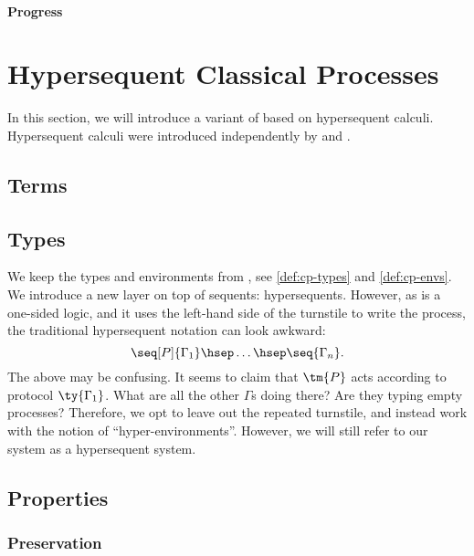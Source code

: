 \documentclass{article}
\begin{document}
\paragraph{Progress}\label{sec:cp-progress}



\section{Hypersequent Classical Processes}\label{sec:hcp}
In this section, we will introduce a variant of \cp based on hypersequent
calculi.
Hypersequent calculi were introduced independently by \textcite{avron1987} and
\textcite{pottinger1983}.

\subsection{Terms}\label{sec:hcp-terms}




\subsection{Types}\label{sec:hcp-types}
We keep the types and environments from \cp, see \cref{def:cp-types} and
\cref{def:cp-envs}.
We introduce a new layer on top of sequents: hypersequents.
However, as \cp is a one-sided logic, and it uses the left-hand side of the
turnstile to write the process, the traditional hypersequent notation can look
awkward:
\[
  \seq[P]{\Gamma_1}\hsep\dots\hsep\seq{\Gamma_n}.
\]
The above may be confusing. It seems to claim that $\tm{P}$ acts according to
protocol $\ty{\Gamma_1}$. What are all the other $\Gamma$s doing there?
Are they typing empty processes?
Therefore, we opt to leave out the repeated turnstile, and instead work with the
notion of ``hyper-environments''. However, we will still refer to our system as a
hypersequent system.



\subsection{Properties}\label{sec:hcp-properties}

\subsubsection{Preservation}\label{sec:hcp-preservation}



\end{document}
